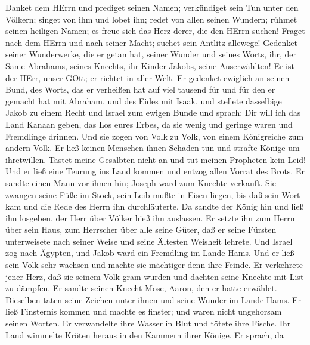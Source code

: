  Danket dem HErrn und prediget seinen Namen; verkündiget
sein Tun unter den Völkern;  singet von ihm und lobet ihn;
redet von allen seinen Wundern;  rühmet seinen heiligen
Namen; es freue sich das Herz derer, die den HErrn suchen! 
Fraget nach dem HErrn und nach seiner Macht; suchet sein Antlitz
allewege!  Gedenket seiner Wunderwerke, die er getan hat,
seiner Wunder und seines Worts,  ihr, der Same Abrahams,
seines Knechts, ihr Kinder Jakobs, seine Auserwählten!  Er
ist der HErr, unser GOtt; er richtet in aller Welt.  Er
gedenket ewiglich an seinen Bund, des Worts, das er verheißen hat auf
viel tausend für und für  den er gemacht hat mit Abraham,
und des Eides mit Isaak,  und stellete dasselbige Jakob zu
einem Recht und Israel zum ewigen Bunde  und sprach: Dir
will ich das Land Kanaan geben, das Los eures Erbes,  da
sie wenig und geringe waren und Fremdlinge drinnen.  Und
sie zogen von Volk zu Volk, von einem Königreiche zum andern Volk.
 Er ließ keinen Menschen ihnen Schaden tun und strafte
Könige um ihretwillen.  Tastet meine Gesalbten nicht an und
tut meinen Propheten kein Leid!  Und er ließ eine Teurung
ins Land kommen und entzog allen Vorrat des Brots.  Er
sandte einen Mann vor ihnen hin; Joseph ward zum Knechte verkauft.
 Sie zwangen seine Füße im Stock, sein Leib mußte in Eisen
liegen,  bis daß sein Wort kam und die Rede des Herrn ihn
durchläuterte.  Da sandte der König hin und ließ ihn
losgeben, der Herr über Völker hieß ihn auslassen.  Er
setzte ihn zum Herrn über sein Haus, zum Herrscher über alle seine
Güter,  daß er seine Fürsten unterweisete nach seiner Weise
und seine Ältesten Weisheit lehrete.  Und Israel zog nach
Ägypten, und Jakob ward ein Fremdling im Lande Hams.  Und
er ließ sein Volk sehr wachsen und machte sie mächtiger denn ihre
Feinde.  Er verkehrete jener Herz, daß sie seinem Volk gram
wurden und dachten seine Knechte mit List zu dämpfen.  Er
sandte seinen Knecht Mose, Aaron, den er hatte erwählet. 
Dieselben taten seine Zeichen unter ihnen und seine Wunder im Lande
Hams.  Er ließ Finsternis kommen und machte es finster; und
waren nicht ungehorsam seinen Worten.  Er verwandelte ihre
Wasser in Blut und tötete ihre Fische.  Ihr Land wimmelte
Kröten heraus in den Kammern ihrer Könige.  Er sprach, da
